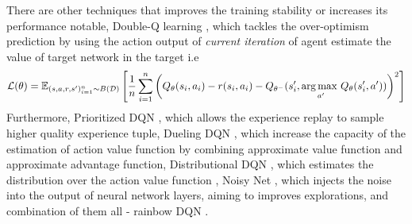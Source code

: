 There are other techniques that improves the training stability or increases its performance notable, Double-Q learning \cite{van2016deep}, which tackles the over-optimism prediction by using the action output of \textit{current iteration} of agent estimate the value of target network in the target i.e
\begin{equation}
    \mathcal{L}(\theta) = \mathbb{E}_{(s, a, r, s')^n_{i=1} \sim B(\mathcal{D})}\left[  \frac{1}{n}\sum^n_{i=1} \left( Q_{\theta}(s_i, a_i) - r(s_i, a_i) - Q_{\theta^-}(s'_i, \underset{a'}{\arg\max \ } Q_\theta(s'_i, a')) \right)^2  \right]
\end{equation}
Furthermore, Prioritized DQN \cite{schaul2015prioritized}, which allows the experience replay to sample higher quality experience tuple, Dueling DQN \cite{wang2015dueling}, which increase the capacity of the estimation of action value function by combining approximate value function and approximate advantage function, Distributional DQN \cite{bellemare2017distributional}, which estimates the distribution over the action value function \cite{osband2018randomized}, Noisy Net \cite{fortunato2017noisy}, which injects the noise into the output of neural network layers, aiming to improves explorations, and combination of them all - rainbow DQN \cite{hessel2018rainbow}.

